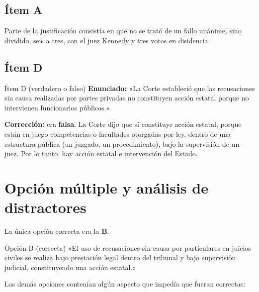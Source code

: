 \documentclass[12pt,oneside]{book}
\begin{document}
\subsection{Ítem A}

Parte de la justificación consistía en que no se trató de un fallo unánime, sino dividido, seis a tres, con el juez Kennedy y tres votos en disidencia.

\subsection{Ítem D}

\begin{exercise}{Ítem D (verdadero o falso)}
\textbf{Enunciado:} «La Corte estableció que las recusaciones sin causa realizadas por partes privadas no constituyen acción estatal porque no intervienen funcionarios públicos.»

\textbf{Corrección:} era \textbf{falsa}. La Corte dijo que sí constituye acción estatal, porque están en juego competencias o facultades otorgadas por ley, dentro de una estructura pública (un juzgado, un procedimiento), bajo la supervisión de un juez. Por lo tanto, hay acción estatal e intervención del Estado.
\end{exercise}

\section{Opción múltiple y análisis de distractores}

La única opción correcta era la \textbf{B}.

\begin{exercise}{Opción B (correcta)}
«El uso de recusaciones sin causa por particulares en juicios civiles se realiza bajo prestación legal dentro del tribunal y bajo supervisión judicial, constituyendo una acción estatal.»
\end{exercise}

Las demás opciones contenían algún aspecto que impedía que fueran correctas:
\end{document}
